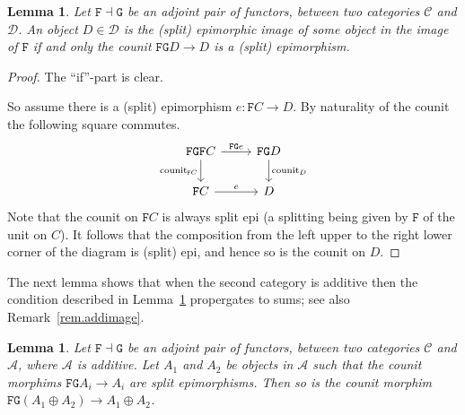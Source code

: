\documentclass[a4paper]{amsart}
\theoremstyle{plain}
\newtheorem{lemma}[theorem]{Lemma}
\theoremstyle{definition}
\theoremstyle{remark}
\begin{document}
\begin{lemma} \label{lemma.split_epi_counit}
Let \( \mathtt F \dashv \mathtt G \) be an adjoint pair of functors, between two categories \( \mathcal{C} \) and \( \mathcal{D} \). An object \( D \in \mathcal{D} \) is the (split) epimorphic image of some object in the image of \( \mathtt{F} \) if and only the counit \( \mathtt F \mathtt G D \to D \) is a (split) epimorphism.
\end{lemma}

\begin{proof}
The ``if''-part is clear.

So assume there is a (split) epimorphism \( e \colon \mathtt{F}C \to D \). By naturality of the counit the following square commutes.
\[ \begin{tikzcd}
\mathtt{F} \mathtt{G} \mathtt{F} C \ar[r,"\mathtt{F}\mathtt{G}e"] \ar[d,swap,"\operatorname{counit}_{\mathtt{F}C}"] & \mathtt{F} \mathtt{G} D \ar[d,"\operatorname{counit}_{D}"]  \\
\mathtt{F} C  \ar[r,"e"] & D
\end{tikzcd} \]
Note that the counit on \( \mathtt{F}C \) is always split epi (a splitting being given by \( \mathtt{F} \) of the unit on \( C \)). It follows that the composition from the left upper to the right lower corner of the diagram is (split) epi, and hence so is the counit on \( D \).
\end{proof}

The next lemma shows that when the second category is additive then the condition described in Lemma~\ref{lemma.split_epi_counit} propergates to sums; see also Remark~\ref{rem.addimage}.

\begin{lemma} \label{lemma:sums_ok_for_adj}
Let \( \mathtt F \dashv \mathtt G \) be an adjoint pair of functors, between two categories \( \mathcal{C} \) and \( \mathcal{A} \), where \( \mathcal{A} \) is additive. Let \( A_1 \) and \( A_2 \) be objects in \( \mathcal{A} \) such that the counit morphims \( \mathtt F \mathtt G A_i \to A_i \) are split epimorphisms. Then so is the counit morphim \( \mathtt F \mathtt G (A_1 \oplus A_2) \to A_1 \oplus A_2 \).
\end{lemma}
\end{document}
